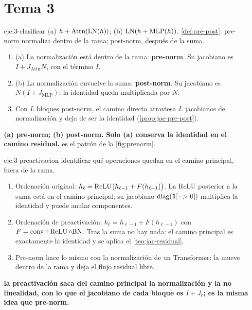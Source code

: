 \section{Tema 3}

\begin{solucion}{eje:3-clasificar}
\datos (a) $h+\operatorname{Attn}(\operatorname{LN}(h))$; (b) $\operatorname{LN}(h+\operatorname{MLP}(h))$.
\planteamiento \cref{def:pre-post}: pre-norm normaliza dentro de la rama; post-norm, después de la suma.
\pasos
\begin{enumerate}[label=\arabic*.]
  \item (a) La normalización está dentro de la rama: \textbf{pre-norm}. Su jacobiano es $I+J_{\mathrm{Attn}}N$, con el término $I$.
  \item (b) La normalización envuelve la suma: \textbf{post-norm}. Su jacobiano es $N(I+J_{\mathrm{MLP}})$; la identidad queda multiplicada por $N$.
  \item Con $L$ bloques post-norm, el camino directo atraviesa $L$ jacobianos de normalización y deja de ser la identidad (\cref{prop:jac-pre-post}).
\end{enumerate}
\resultado \textbf{(a) pre-norm; (b) post-norm. Solo (a) conserva la identidad en el camino residual.}
\comprobacion es el patrón de la \cref{fig:prenorm}.
\end{solucion}

\begin{solucion}{eje:3-preactivacion}
\planteamiento identificar qué operaciones quedan en el camino principal, fuera de la rama.
\pasos
\begin{enumerate}[label=\arabic*.]
  \item Ordenación original: $h_\ell=\operatorname{ReLU}\bigl(h_{\ell-1}+F(h_{\ell-1})\bigr)$. La ReLU posterior a la suma está en el camino principal; su jacobiano $\operatorname{diag}(\mathbf 1[\,\cdot>0])$ multiplica la identidad y puede anular componentes.
  \item Ordenación de preactivación: $h_\ell=h_{\ell-1}+F(h_{\ell-1})$ con $F=\mathrm{conv}\circ\operatorname{ReLU}\circ\mathrm{BN}$. Tras la suma no hay nada: el camino principal es exactamente la identidad y se aplica el \cref{teo:jac-residual}.
  \item Pre-norm hace lo mismo con la normalización de un Transformer: la mueve dentro de la rama y deja el flujo residual libre.
\end{enumerate}
\resultado \textbf{la preactivación saca del camino principal la normalización y la no linealidad, con lo que el jacobiano de cada bloque es $I+J_\ell$; es la misma idea que pre-norm.}
\end{solucion}

